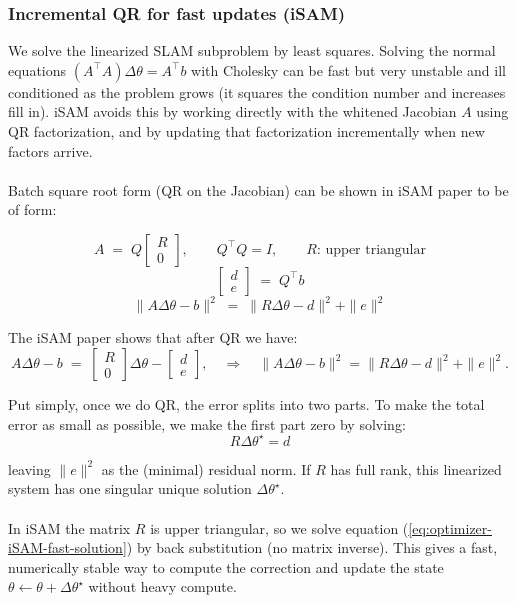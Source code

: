 \subsubsection{Incremental QR for fast updates (iSAM)}
We solve the linearized SLAM subproblem by least squares. Solving the normal equations $(A^\top A)\Delta\theta = A^\top b$ with Cholesky can be fast but very unstable and ill conditioned as the problem grows (it squares the condition number and increases fill in). iSAM avoids this by working directly with the whitened Jacobian $A$ using QR factorization, and by updating that factorization incrementally when new factors arrive.
\\ \\
Batch square root form (QR on the Jacobian) can be shown in iSAM paper \cite{iSAM_paper} to be of form:

$$
    A \;=\; Q
    \begin{bmatrix}
    R\\[2pt]
    0
    \end{bmatrix},
    \qquad Q^\top Q = I,
    \qquad R \text{: upper triangular}
$$
$$
    \begin{bmatrix}
    d\\ e
    \end{bmatrix}
    \;=\;
    Q^\top b
$$
$$
    \|A\Delta\theta - b\|^2
    \;=\;
    \|R\Delta\theta - d\|^2 + \|e\|^2
$$

\noindent
The iSAM paper \cite{iSAM_paper} shows that after QR we have:
$$
    A\Delta\theta - b \;=\;
    \begin{bmatrix} R \\ 0 \end{bmatrix}\Delta\theta -
    \begin{bmatrix} d \\ e \end{bmatrix},
    \quad\Rightarrow\quad
    \|A\Delta\theta - b\|^2 = \|R\Delta\theta - d\|^2 + \|e\|^2.
$$

\noindent
Put simply, once we do QR, the error splits into two parts. To make the total error as small as possible, we make the first part zero by solving:
\begin{equation}
    R\Delta\theta^\star = d
    \label{eq:optimizer-iSAM-fast-solution}
\end{equation}

\noindent
leaving $\|e\|^2$ as the (minimal) residual norm. If $R$ has full rank, this linearized system has one singular unique solution $\Delta\theta^\star$.
\\ \\
In iSAM the matrix $R$ is upper triangular, so we solve equation (\ref{eq:optimizer-iSAM-fast-solution}) by back substitution (no matrix inverse). This gives a fast, numerically stable way to compute the correction and update the state $\theta \leftarrow \theta + \Delta\theta^\star$ without heavy compute.



